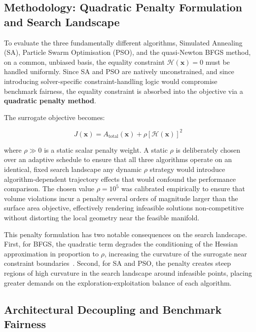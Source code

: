 \subsection{Methodology: Quadratic Penalty Formulation and Search Landscape}

To evaluate the three fundamentally different algorithms, Simulated Annealing (SA), Particle Swarm Optimisation (PSO), and the quasi-Newton BFGS method, on a common, unbiased basis, the equality constraint $\mathcal{H}(\mathbf{x}) = 0$ must be handled uniformly. 
Since SA and PSO are natively unconstrained, and since introducing solver-specific constraint-handling logic would compromise benchmark fairness, the equality constraint is absorbed into the objective via a \textbf{quadratic penalty method}. 

The surrogate objective becomes:

\begin{equation}
    J(\mathbf{x}) = A_{\text{total}}(\mathbf{x}) + \rho \left[\mathcal{H}(\mathbf{x})\right]^2
\end{equation}

where $\rho \gg 0$ is a static scalar penalty weight. A static $\rho$ is deliberately chosen over an adaptive schedule to ensure that all three algorithms operate on an identical, fixed search landscape any dynamic $\rho$ strategy would introduce algorithm-dependent trajectory effects that would confound the performance comparison. 
The chosen value $\rho = 10^5$ was calibrated empirically to ensure that volume violations incur a penalty several orders of magnitude larger than the surface area objective, effectively rendering infeasible solutions non-competitive without distorting the local geometry near the feasible manifold.

This penalty formulation has two notable consequences on the search landscape. 
First, for BFGS, the quadratic term degrades the conditioning of the Hessian approximation in proportion to $\rho$, increasing the curvature of the surrogate near constraint boundaries~\cite{nocedalwright2006}. 
Second, for SA and PSO, the penalty creates steep regions of high curvature in the search landscape around infeasible points, placing greater demands on the exploration-exploitation balance of each algorithm.

\subsection{Architectural Decoupling and Benchmark Fairness}

